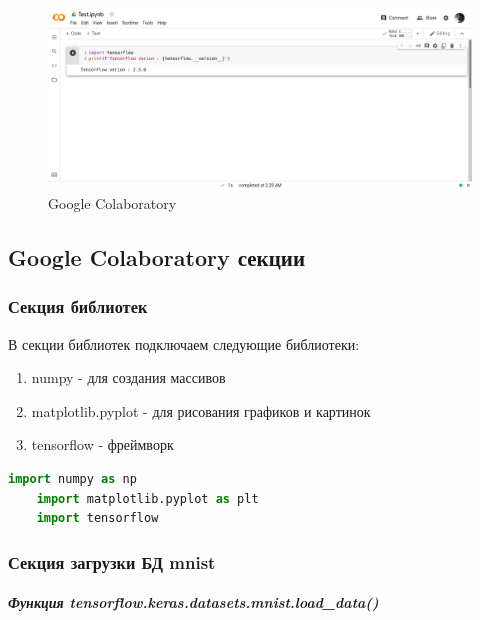 \begin{figure}[!htbp]
    \centering
    \includegraphics[width=16cm]
    {_INCLUDES/main/4/GoogleColaboratory.png}
    \caption{Google Colaboratory}
    \label{fig:4_GoogleColaboratory}
\end{figure}



\subsection{Google Colaboratory секции}



\subsubsection{Секция библиотек}

В секции библиотек подключаем следующие библиотеки:

\begin{enumerate}
    \item numpy - для создания массивов
    \item matplotlib.pyplot - для рисования графиков и картинок
    \item tensorflow - фреймворк
\end{enumerate}

\begin{lstlisting}[language=Python,]
    import numpy as np
    import matplotlib.pyplot as plt
    import tensorflow
\end{lstlisting}



\subsubsection{Секция загрузки БД mnist}

\subparagraph{Функция tensorflow.keras.datasets.mnist.load\_data()} \hspace{0pt}

